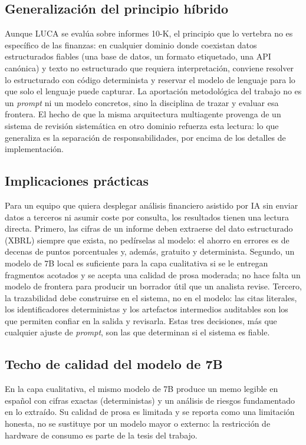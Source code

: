 \documentclass[conference]{IEEEtran}
\begin{document}
\subsection{Generalización del principio híbrido}
Aunque LUCA se evalúa sobre informes 10-K, el principio que lo vertebra no es
específico de las finanzas: en cualquier dominio donde coexistan datos
estructurados fiables (una base de datos, un formato etiquetado, una API
canónica) y texto no estructurado que requiera interpretación, conviene resolver
lo estructurado con código determinista y reservar el modelo de lenguaje para lo
que solo el lenguaje puede capturar. La aportación metodológica del trabajo no es
un \textit{prompt} ni un modelo concretos, sino la disciplina de trazar y evaluar
esa frontera. El hecho de que la misma arquitectura multiagente provenga de un
sistema de revisión sistemática en otro dominio refuerza esta lectura: lo que
generaliza es la separación de responsabilidades, por encima de los detalles de
implementación.

\subsection{Implicaciones prácticas}
Para un equipo que quiera desplegar análisis financiero asistido por IA sin enviar
datos a terceros ni asumir coste por consulta, los resultados tienen una lectura
directa. Primero, las cifras de un informe deben extraerse del dato estructurado
(XBRL) siempre que exista, no pedírselas al modelo: el ahorro en errores es de
decenas de puntos porcentuales y, además, gratuito y determinista. Segundo, un
modelo de 7B local es suficiente para la capa cualitativa si se le entregan
fragmentos acotados y se acepta una calidad de prosa moderada; no hace falta un
modelo de frontera para producir un borrador útil que un analista revise. Tercero,
la trazabilidad debe construirse en el sistema, no en el modelo: las citas
literales, los identificadores deterministas y los artefactos intermedios
auditables son los que permiten confiar en la salida y revisarla. Estas tres
decisiones, más que cualquier ajuste de \textit{prompt}, son las que determinan si
el sistema es fiable.

\subsection{Techo de calidad del modelo de 7B}
En la capa cualitativa, el mismo modelo de 7B produce un memo legible en español
con cifras exactas (deterministas) y un análisis de riesgos fundamentado en lo
extraído. Su calidad de prosa es limitada y se reporta como una limitación
honesta, no se sustituye por un modelo mayor o externo: la restricción de
hardware de consumo es parte de la tesis del trabajo.
\end{document}
